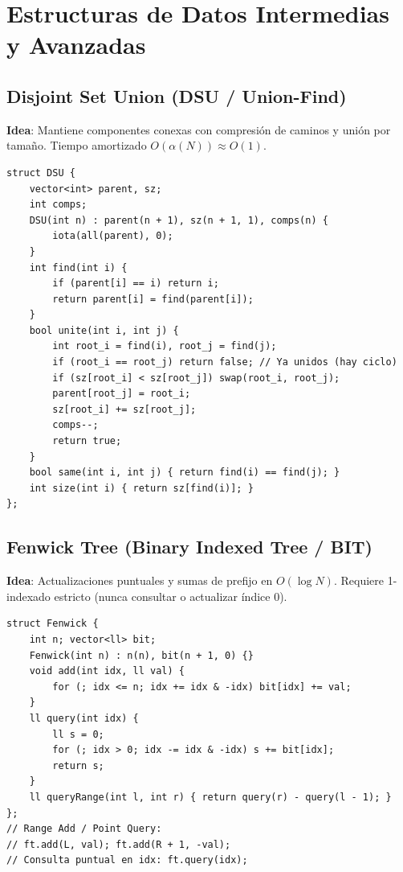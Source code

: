 \documentclass[9pt,twocolumn,a4paper]{extarticle}
\begin{document}
\section{Estructuras de Datos Intermedias y Avanzadas}
\subsection{Disjoint Set Union (DSU / Union-Find)}
\textbf{Idea}: Mantiene componentes conexas con compresión de caminos y unión por tamaño. Tiempo amortizado $O(\alpha(N)) \approx O(1)$.
\begin{lstlisting}
struct DSU {
    vector<int> parent, sz;
    int comps;
    DSU(int n) : parent(n + 1), sz(n + 1, 1), comps(n) {
        iota(all(parent), 0);
    }
    int find(int i) {
        if (parent[i] == i) return i;
        return parent[i] = find(parent[i]);
    }
    bool unite(int i, int j) {
        int root_i = find(i), root_j = find(j);
        if (root_i == root_j) return false; // Ya unidos (hay ciclo)
        if (sz[root_i] < sz[root_j]) swap(root_i, root_j);
        parent[root_j] = root_i;
        sz[root_i] += sz[root_j];
        comps--;
        return true;
    }
    bool same(int i, int j) { return find(i) == find(j); }
    int size(int i) { return sz[find(i)]; }
};
\end{lstlisting}

\subsection{Fenwick Tree (Binary Indexed Tree / BIT)}
\textbf{Idea}: Actualizaciones puntuales y sumas de prefijo en $O(\log N)$. Requiere 1-indexado estricto (nunca consultar o actualizar índice 0).
\begin{lstlisting}
struct Fenwick {
    int n; vector<ll> bit;
    Fenwick(int n) : n(n), bit(n + 1, 0) {}
    void add(int idx, ll val) {
        for (; idx <= n; idx += idx & -idx) bit[idx] += val;
    }
    ll query(int idx) {
        ll s = 0;
        for (; idx > 0; idx -= idx & -idx) s += bit[idx];
        return s;
    }
    ll queryRange(int l, int r) { return query(r) - query(l - 1); }
};
// Range Add / Point Query:
// ft.add(L, val); ft.add(R + 1, -val);
// Consulta puntual en idx: ft.query(idx);
\end{lstlisting}
\end{document}

